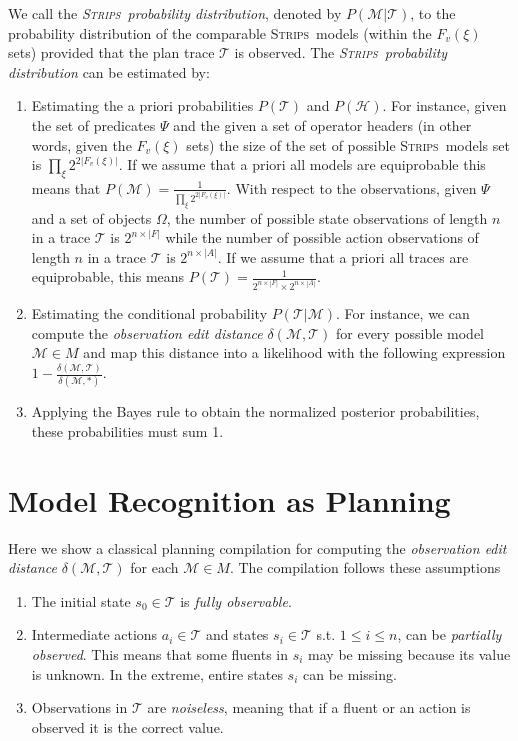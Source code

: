 \documentclass[letterpaper]{article} %
\newcommand{\strips}{\textsc{Strips}}     %
\begin{document}
We call the {\em \strips\ probability distribution}, denoted by $P(\mathcal{M}|\mathcal{T})$, to the probability distribution of the comparable \strips\ models (within the $F_v(\xi)$ sets) provided that the plan trace $\mathcal{T}$ is observed. The {\em \strips\ probability distribution} can be estimated by:
\begin{enumerate}
\item Estimating the a priori probabilities $P(\mathcal{T})$ and $P(\mathcal{H})$. For instance, given the set of predicates $\Psi$ and the given a set of operator headers (in other words, given the $F_v(\xi)$ sets) the size of the set of possible \strips\ models set is $\prod_\xi 2^{2|F_v(\xi)|}$. If we assume that a priori all models are equiprobable this means that $P(\mathcal{M})=\frac{1}{\prod_\xi 2^{2|F_v(\xi)|}}$. With respect to the observations, given $\Psi$ and a set of objects $\Omega$, the number of possible state observations of length $n$ in a trace $\mathcal{T}$ is $2^{n\times|F|}$ while the number of possible action observations of length $n$ in a trace $\mathcal{T}$ is $2^{n\times|A|}$. If we assume that a priori all traces are equiprobable, this means $P(\mathcal{T})=\frac{1}{2^{n\times|F|}\times 2^{n\times|A|}}$.
\item Estimating the conditional probability $P(\mathcal{T}|\mathcal{M})$. For instance, we can compute the {\em observation edit distance} $\delta(\mathcal{M},\mathcal{T})$ for every possible model $\mathcal{M}\in M$ and map  this distance into a likelihood with the following expression $1-\frac{\delta(\mathcal{M},\mathcal{T})}{\delta(\mathcal{M},*)}$. 
\item Applying the Bayes rule to obtain the normalized posterior probabilities, these probabilities must sum 1.
\end{enumerate}



\section{Model Recognition as Planning}
\label{sec:asPlanning}
Here we show a classical planning compilation for computing the {\em observation edit distance} $\delta(\mathcal{M},\mathcal{T})$ for each $\mathcal{M}\in M$. The compilation follows these assumptions
\begin{enumerate}
\item The initial state $s_0\in\mathcal{T}$ is {\em fully observable}.
\item Intermediate actions $a_i\in\mathcal{T}$ and states $s_i\in\mathcal{T}$ s.t. {\small $1\leq i\leq n$}, can be {\em partially observed}. This means that some fluents in $s_i$ may be missing because its value is unknown. In the extreme, entire states $s_i$ can be missing. 
\item Observations in $\mathcal{T}$ are {\em noiseless}, meaning that if a fluent or an action is observed it is the correct value. 
\end{enumerate}
\end{document}
